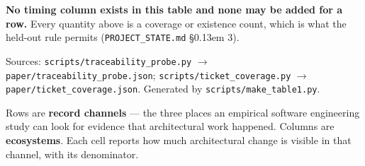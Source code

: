 \documentclass[11pt,a4paper]{article}
\begin{document}
\begin{landscape}
\textbf{No timing column exists in this table and none may be added for a \textdagger{} row.} Every quantity above is a coverage or existence count, which is what the held-out rule permits (\texttt{PROJECT\_\allowbreak{}STATE.\allowbreak{}md} \S\kern0.13em 3).



Sources: \texttt{scripts/\allowbreak{}traceability\_\allowbreak{}probe.\allowbreak{}py} $\rightarrow$ \texttt{paper/\allowbreak{}traceability\_\allowbreak{}probe.\allowbreak{}json}; \texttt{scripts/\allowbreak{}ticket\_\allowbreak{}coverage.\allowbreak{}py} $\rightarrow$ \texttt{paper/\allowbreak{}ticket\_\allowbreak{}coverage.\allowbreak{}json}. Generated by \texttt{scripts/\allowbreak{}make\_\allowbreak{}table1.\allowbreak{}py}.



\end{landscape}



Rows are \textbf{record channels} --- the three places an empirical software engineering study can look for evidence that architectural work happened. Columns are \textbf{ecosystems}. Each cell reports how much architectural change is visible in that channel, with its denominator.



\begingroup\footnotesize\setlength{\tabcolsep}{3pt}
\end{document}
